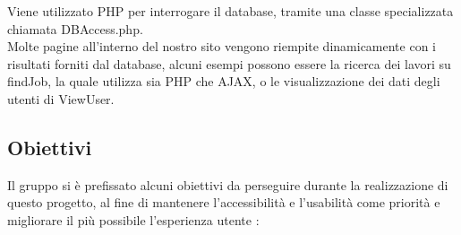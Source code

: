   Viene utilizzato PHP per interrogare il database, tramite una classe specializzata chiamata DBAccess.php. \\
  Molte pagine all'interno del nostro sito vengono riempite dinamicamente con i risultati forniti dal database, 
  alcuni esempi possono essere la ricerca dei lavori su findJob, la quale utilizza sia PHP che AJAX, o le visualizzazione dei dati degli utenti di ViewUser.

  

  \subsection{Obiettivi}
  Il gruppo si è prefissato alcuni obiettivi da perseguire durante la realizzazione di questo progetto, al fine di mantenere l'accessibilità e l'usabilità come priorità e migliorare il più possibile l'esperienza utente :
